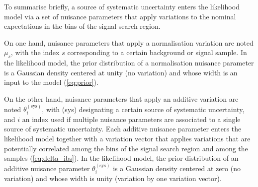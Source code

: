 To summarise briefly, a source of systematic uncertainty enters the likelihood model via a set of nuisance parameters that apply variations to the nominal expectations in the bins of the signal search region.

On one hand, nuisance parameters that apply a normalisation variation are noted $\mu_s$, with the index $s$ corresponding to a certain background or signal sample.
In the likelihood model, the prior distribution of a normalisation nuisance parameter is a Gaussian density centered at unity (no variation) and whose width is an input to the model (\cref{eq:prior}).

On the other hand, nuisance parameters that apply an additive variation are noted $\theta^{(\mathrm{sys})}_i$, with (sys) designating a certain source of systematic uncertainty, and $i$ an index used if multiple nuisance parameters are associated to a single source of systematic uncertainty.
Each additive nuisance parameter enters the likelihood model together with a variation vector that applies variations that are potentially correlated among the bins of the signal search region and among the samples (\cref{eq:delta_ibs}).
In the likelihood model, the prior distribution of an additive nuisance parameter $\theta^{(\mathrm{sys})}_i$ is a Gaussian density centered at zero (no variation) and whose width is unity (variation by one variation vector).


